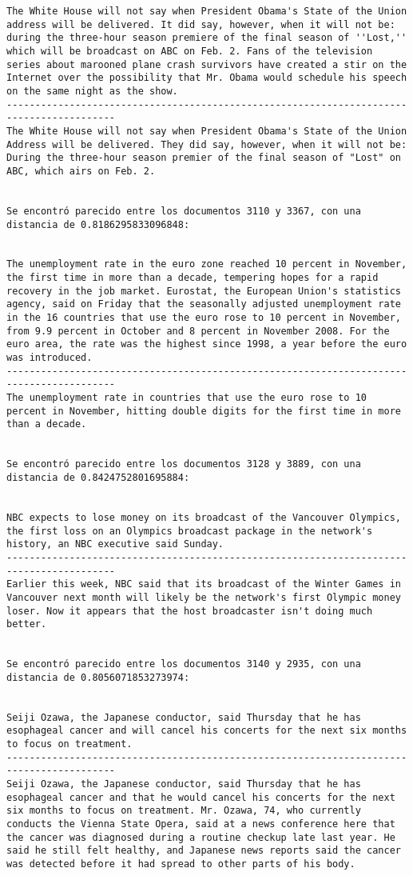 \documentclass[11pt]{article}
\begin{document}
\begin{Verbatim}[commandchars=\\\{\}]
The White House will not say when President Obama's State of the Union address will be delivered. It did say, however, when it will not be: during the three-hour season premiere of the final season of ''Lost,'' which will be broadcast on ABC on Feb. 2. Fans of the television series about marooned plane crash survivors have created a stir on the Internet over the possibility that Mr. Obama would schedule his speech on the same night as the show.
-----------------------------------------------------------------------------------------
The White House will not say when President Obama's State of the Union Address will be delivered. They did say, however, when it will not be: During the three-hour season premier of the final season of "Lost" on ABC, which airs on Feb. 2.


Se encontró parecido entre los documentos 3110 y 3367, con una distancia de 0.8186295833096848:


The unemployment rate in the euro zone reached 10 percent in November, the first time in more than a decade, tempering hopes for a rapid recovery in the job market. Eurostat, the European Union's statistics agency, said on Friday that the seasonally adjusted unemployment rate in the 16 countries that use the euro rose to 10 percent in November, from 9.9 percent in October and 8 percent in November 2008. For the euro area, the rate was the highest since 1998, a year before the euro was introduced.
-----------------------------------------------------------------------------------------
The unemployment rate in countries that use the euro rose to 10 percent in November, hitting double digits for the first time in more than a decade.


Se encontró parecido entre los documentos 3128 y 3889, con una distancia de 0.8424752801695884:


NBC expects to lose money on its broadcast of the Vancouver Olympics, the first loss on an Olympics broadcast package in the network's history, an NBC executive said Sunday.
-----------------------------------------------------------------------------------------
Earlier this week, NBC said that its broadcast of the Winter Games in Vancouver next month will likely be the network's first Olympic money loser. Now it appears that the host broadcaster isn't doing much better.


Se encontró parecido entre los documentos 3140 y 2935, con una distancia de 0.8056071853273974:


Seiji Ozawa, the Japanese conductor, said Thursday that he has esophageal cancer and will cancel his concerts for the next six months to focus on treatment.
-----------------------------------------------------------------------------------------
Seiji Ozawa, the Japanese conductor, said Thursday that he has esophageal cancer and that he would cancel his concerts for the next six months to focus on treatment. Mr. Ozawa, 74, who currently conducts the Vienna State Opera, said at a news conference here that the cancer was diagnosed during a routine checkup late last year. He said he still felt healthy, and Japanese news reports said the cancer was detected before it had spread to other parts of his body.



\end{Verbatim}
\end{document}
